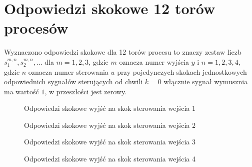 \section{Odpowiedzi skokowe 12 torów procesów}
\label{projekt:zad2}


Wyznaczono odpowiedzi skokowe dla 12 torów procesu 
to znaczy zestaw liczb $s_{1}^{m,n}, s_{2}^{m,n}, ...$ dla $m = 1, 2, 3$, 
gdzie $m$ oznacza numer wyjścia $y$ i $n = 1, 2, 3, 4$, 
gdzie $n$ oznacza numer sterowania $u$ przy pojedynczych skokach jednostkowych odpowiednich sygnałów  sterujących
od chwili $k = 0$ włącznie sygnał wymusznia ma wartość $1$, 
w przeszłości jest zerowy.


\ifdefined\CompileFigures
\begin{figure}[H] 
    \centering
    
    \caption{Odpowiedzi skokowe wyjść na skok sterowania wejścia 1}
    \label{projekt:zad2:figure:projzadanie2u1}
\end{figure}
\fi

\ifdefined\CompileFigures
\begin{figure}[H] 
    \centering
    
    \caption{Odpowiedzi skokowe wyjść na skok sterowania wejścia 2}
    \label{projekt:zad2:figure:projzadanie2u2}
\end{figure}
\fi

\ifdefined\CompileFigures
\begin{figure}[H] 
    \centering
    
    \caption{Odpowiedzi skokowe wyjść na skok sterowania wejścia 3}
    \label{projekt:zad2:figure:projzadanie2u3}
\end{figure}
\fi

\ifdefined\CompileFigures
\begin{figure}[H] 
    \centering
    
    \caption{Odpowiedzi skokowe wyjść na skok sterowania wejścia 4}
    \label{projekt:zad2:figure:projzadanie2u4}
\end{figure}
\fi

\newpage
